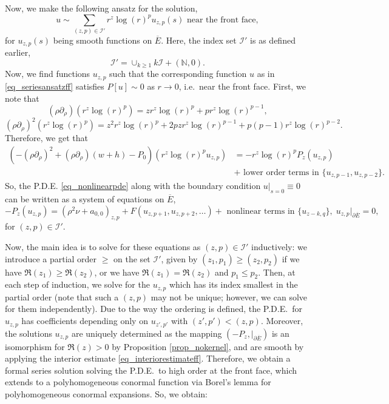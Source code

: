 \documentclass[10pt, a4paper]{article}
\theoremstyle{plain}%
\theoremstyle{definition}
\numberwithin{figure}{section}
\numberwithin{equation}{section}
\newcommand{\bN}{\mathbb{N}}
\newcommand{\pa}{\partial}
\newcommand{\rt}{\rightarrow}
\newcommand{\oE}{{\overline{E}}}
\newcommand{\cI}{\mathcal{I}}
\begin{document}
 Now, we make the following ansatz for the solution, 
\begin{equation}\label{eq_seriesansatzff}
	u \sim \sum_{(z,p)\in \cI'} r^z\log(r)^pu_{z,p}(s) \textrm{ near the front face},
\end{equation}
for $u_{z,p}(s)$ being smooth functions on $\oE$. Here, the index set $\cI'$ is as defined earlier,\[
\cI'= \cup_{k\geq 1} k\cI+(\bN,0).
\]
Now, we find functions $u_{z,p}$ such that the corresponding function $u$ as in \eqref{eq_seriesansatzff} satisfies $P[u]\sim 0$ as $r\rt 0$, i.e.\ near the front face. First, we note that \[
(\rho\pa_\rho)(r^z\log(r)^p) = zr^z\log(r)^p + p r^z\log(r)^{p-1},\]
\[ (\rho\pa_\rho)^2(r^z\log(r)^p) = z^2r^z\log(r)^p + 2pz r^z\log(r)^{p-1} + p(p-1)r^z\log(r)^{p-2}.
\]
Therefore, we get that
\begin{equation}\begin{split}
		\left(- (\rho\pa_\rho)^2+(\rho\pa_\rho)(w+h) - P_0\right)(r^z\log(r)^pu_{z,p}) &= -r^z\log(r)^pP_z(u_{z,p}) \\
		&+ \textrm{ lower order terms in } \{ u_{z,p-1},u_{z,p-2}\}.
	\end{split}
\end{equation}
So, the P.D.E. \eqref{eq_nonlinearpde} along with the boundary condition $u|_{s=0}\equiv0$ can be written as a system of equations on $\oE$, \[
-P_{z}(u_{z,p}) = (\rho^2\nu+a_{0,0})_{z,p} + F(u_{z,p+1},u_{z,p+2},\dots) + \textrm{ nonlinear terms in }\{u_{z-k,q}\},\; u_{z,p}|_{\pa\oE} = 0,
\]
for $(z,p) \in \cI'$.


Now, the main idea is to solve for these equations as $(z,p) \in \cI'$ inductively: we introduce a partial order $\geq$ on the set $\cI'$, given by $(z_1,p_1)\geq(z_2,p_2)$ if we have $\Re(z_1)\geq\Re(z_2)$, or we have $\Re(z_1)=\Re(z_2)$ and $p_1\leq p_2$. Then, at each step of induction, we solve for the $u_{z,p}$ which has its index smallest in the partial order (note that such a $(z,p)$ may not be unique; however, we can solve for them independently). Due to the way the ordering is defined, the P.D.E.\ for $u_{z,p}$ has coefficients depending only on $u_{z',p'}$ with $(z',p')<(z,p)$. Moreover, the solutions $u_{z,p}$ are uniquely determined as the mapping $(-P_z,|_{\pa\oE})$ is an isomorphism for $\Re(z) >0$ by Proposition \ref{prop_nokernel}, and are smooth by applying the interior estimate \eqref{eq_interiorestimateff}. Therefore, we obtain a formal series solution solving the P.D.E.\ to high order at the front face, which extends to a polyhomogeneous conormal function via Borel's lemma for polyhomogeneous conormal expansions. So, we obtain:
\end{document}
